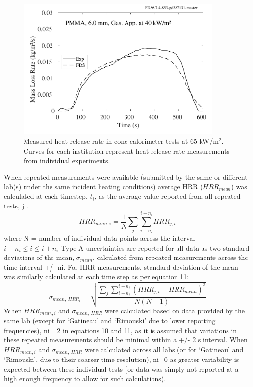 \documentclass{book}
\begin{document}
\begin{figure}
  \centering
  \includegraphics[width=4in]{SCRIPT_FIGURES/PMMA_40}
  \caption{Measured heat release rate in cone calorimeter tests at 65 kW/m$^2$. Curves for each institution represent heat release rate measurements from individual experiments.}
  \label{Fig_17}
\end{figure}

When repeated measurements were available (submitted by the same or different lab(s) under the same incident heating conditions) average HRR ($HRR_{mean}$) was calculated at each timestep, $t_i$, as the average value reported from all repeated tests, j :
\begin{equation}
  HRR_{mean,i}=\frac{1}{N}\sum_{j}\sum_{i-n_i}^{i+n_i}{HRR_{j,i}}
\end{equation}
where N = number of individual data points across the interval $i-n_i\le i\le i+n_i$
Type A uncertainties are reported for all data as two standard deviations of the mean, $\sigma_{mean}$, calculated from repeated measurements across the time interval +/- ni. For HRR measurements, standard deviation of the mean was similarly calculated at each time step as per equation 11:
\begin{equation}
   \sigma_{mean,\ HRR_i}=\sqrt{\frac{\sum_{j}\sum_{i-n_i}^{i+n_i}\left(HRR_{j,i}-HRR_{mean}\right)^2}{N\left(N-1\right)}}
\end{equation}
When $HRR_{mean,i}$ and $\sigma_{mean,\ HRR}$ were calculated based on data provided by the same lab (except for ‘Gatineau’ and ‘Rimouski’ due to lower reporting frequencies), ni =2 in equations 10 and 11, as it is assumed that variations in these repeated measurements should be minimal within a +/- 2 s interval. When $HRR_{mean,i}$ and $\sigma_{mean,\ HRR}$ were calculated across all labs (or for ‘Gatineau’ and ‘Rimouski’, due to their coarser time resolution), ni=0 as greater variability is expected between these individual tests (or data was simply not reported at a high enough frequency to allow for such calculations).
\end{document}
